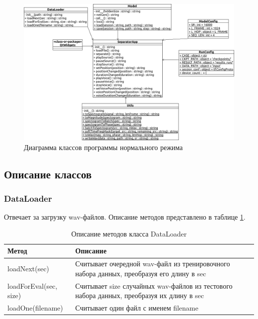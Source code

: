 \begin{figure}
	\centering
	\includegraphics[width=\textwidth]{inc/img/run}
	\caption{Диаграмма классов программы нормального режима}
	\label{imp:run-diagram}
\end{figure}

\subsection{Описание классов}

\subsubsection*{DataLoader}

Отвечает за загрузку wav-файлов. Описание методов представлено в таблице \ref{imp:dataloader}.

\begin{table}[h]
	\caption{\label{imp:dataloader}Описание методов класса DataLoader}
	\begin{center}
		\begin{tabular}{|p{}|p{}|}
			\hline
			Метод & Описание \\
			\hline
			loadNext(sec) & Считывает очередной wav-файл из тренировочного набора данных, преобразуя его длину в sec \\
			\hline
			loadForEval(sec, size) & Считывает size случайных wav-файлов из тестового набора данных, преобразуя их длину в sec \\
			\hline
			loadOne(filename) & Считывает один файл с именем filename \\ 			
			\hline
		\end{tabular}
	\end{center}
\end{table} 


